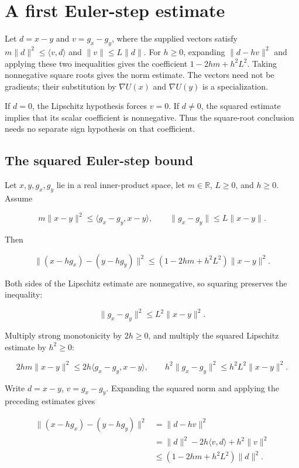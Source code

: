 \documentclass[11pt,a4paper]{report}
\begin{document}
\section{\texorpdfstring{A first Euler-step estimate}{A first Euler-step estimate}}
\label{proof-module-UnadjustedLangevin-GradientStep-lean}


Let \(d=x-y\) and \(v=g_x-g_y\), where the supplied vectors satisfy \(m\|d\|^2\le\langle v,d\rangle\) and \(\|v\|\le L\|d\|\). For \(h\ge0\), expanding \(\|d-hv\|^2\) and applying these two inequalities gives the coefficient \(1-2hm+h^2L^2\). Taking nonnegative square roots gives the norm estimate. The vectors need not be gradients; their substitution by \(\nabla U(x)\) and \(\nabla U(y)\) is a specialization.



If \(d=0\), the Lipschitz hypothesis forces \(v=0\). If \(d\ne0\), the squared estimate implies that its scalar coefficient is nonnegative. Thus the square-root conclusion needs no separate sign hypothesis on that coefficient.

\subsection{\texorpdfstring{The squared Euler-step bound}{The squared Euler-step bound}}
\label{report-step-UnadjustedLangevin-GradientStep-lean-1}


Let \(x,y,g_x,g_y\) lie in a real inner-product space, let \(m\in\mathbb R\), \(L\ge0\), and \(h\ge0\). Assume

\[m\|x-y\|^2\le\langle g_x-g_y,x-y\rangle,\qquad\|g_x-g_y\|\le L\|x-y\|.\]

Then

\[\|(x-hg_x)-(y-hg_y)\|^2\le(1-2hm+h^2L^2)\|x-y\|^2.\]

Both sides of the Lipschitz estimate are nonnegative, so squaring preserves the inequality:

\[\|g_x-g_y\|^2\le L^2\|x-y\|^2.\]

Multiply strong monotonicity by \(2h\ge0\), and multiply the squared Lipschitz estimate by \(h^2\ge0\):

\[2hm\|x-y\|^2\le2h\langle g_x-g_y,x-y\rangle,\qquad h^2\|g_x-g_y\|^2\le h^2L^2\|x-y\|^2.\]

Write \(d=x-y\), \(v=g_x-g_y\). Expanding the squared norm and applying the preceding estimates gives

\[\begin{aligned}\|(x-hg_x)-(y-hg_y)\|^2&=\|d-hv\|^2\\&=\|d\|^2-2h\langle v,d\rangle+h^2\|v\|^2\\&\le(1-2hm+h^2L^2)\|d\|^2.\end{aligned}\]
\end{document}
